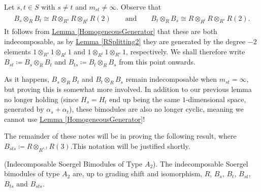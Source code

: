 \noindent Let $s, t \in S$ with $s \neq t$ and $m_{st} \neq \infty$. Observe that
\begin{align*}
\begin{split}
B_s \otimes_R B_t \cong R \otimes_{R^s} R \otimes_{R^t} R(2)\qquad\text{and}\qquad B_t \otimes_R B_s \cong R \otimes_{R^t} R \otimes_{R^s} R(2).
\end{split}
\end{align*}
\noindent It follows from \hyperref[HomogeneousGenerator]{Lemma \ref*{HomogeneousGenerator}} that these are both indecomposable, as by \hyperref[RSplitting2]{Lemma \ref*{RSplitting2}} they are generated by the degree $-2$ elements $1 \otimes_{R^s} 1 \otimes_{R^t} 1$ and $1 \otimes_{R^t} 1 \otimes_{R^s} 1$, respectively. We shall therefore write $B_{st} \coloneqq B_s \otimes_R B_t$ and $B_{ts} \coloneqq B_t \otimes_R B_s$ from this point onwards.\\

\noindent\begin{remark} As it happens, $B_s \otimes_R B_t$ and $B_t \otimes_R B_s$ remain indecomposable when $m_{st} = \infty$, but proving this is somewhat more involved. In addition to our previous lemma no longer holding (since $H_s = H_t$ end up being the same $1$-dimensional space, generated by $\alpha_s + \alpha_t$), these bimodules are also no longer cyclic, meaning we cannot use \hyperref[HomogeneousGenerator]{Lemma \ref*{HomogeneousGenerator}}!\\
\end{remark}

\noindent The remainder of these notes will be in proving the following result, where $B_{sts} \coloneqq R \otimes_{R^{s,t}} R(3)$.\linebreak This notation will be justified shortly.\\

\noindent\begin{proposition}\textup{(Indecomposable Soergel Bimodules of Type $A_2$).} The indecomposable Soergel bimodules of type $A_2$ are, up to grading shift and isomorphism, $R$, $B_s$, $B_t$, $B_{st}$, $B_{ts}$ and $B_{sts}$.\\
\end{proposition}


